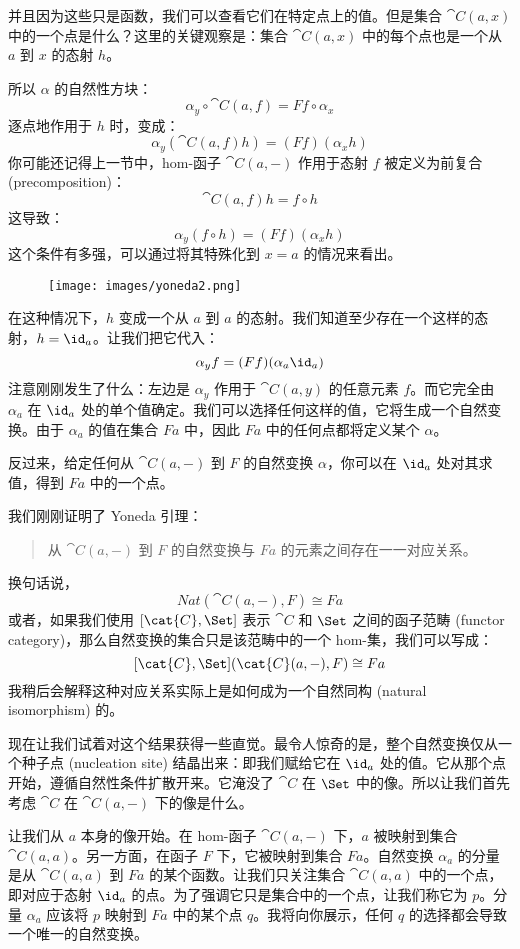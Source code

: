 \noindent
并且因为这些只是函数，我们可以查看它们在特定点上的值。但是集合 $\cat{C}(a, x)$ 中的一个点是什么？这里的关键观察是：集合 $\cat{C}(a, x)$ 中的每个点也是一个从 $a$ 到 $x$ 的态射 $h$。

所以 $\alpha$ 的自然性方块：
\[\alpha_y \circ \cat{C}(a, f) = F f \circ \alpha_x\]
逐点地作用于 $h$ 时，变成：
\[\alpha_y (\cat{C}(a, f) h) = (F f) (\alpha_x h)\]
你可能还记得上一节中，hom-函子 $\cat{C}(a,-)$ 作用于态射 $f$ 被定义为前复合 (precomposition)：
\[\cat{C}(a, f) h = f \circ h\]
这导致：
\[\alpha_y (f \circ h) = (F f) (\alpha_x h)\]
这个条件有多强，可以通过将其特殊化到 $x = a$ 的情况来看出。

\begin{figure}[H]
  \centering
  \texttt{[image: images/yoneda2.png]}
\end{figure}

\noindent
在这种情况下，$h$ 变成一个从 $a$ 到 $a$ 的态射。我们知道至少存在一个这样的态射，$h = \id_a$。让我们把它代入：
\[\alpha_y f = (F f) (\alpha_a \id_a)\]
注意刚刚发生了什么：左边是 $\alpha_y$ 作用于 $\cat{C}(a, y)$ 的任意元素 $f$。而它完全由 $\alpha_a$ 在 $\id_a$ 处的单个值确定。我们可以选择任何这样的值，它将生成一个自然变换。由于 $\alpha_a$ 的值在集合 $F a$ 中，因此 $F a$ 中的任何点都将定义某个 $\alpha$。

反过来，给定任何从 $\cat{C}(a, -)$ 到 $F$ 的自然变换 $\alpha$，你可以在 $\id_a$ 处对其求值，得到 $F a$ 中的一个点。

我们刚刚证明了 Yoneda 引理：

\begin{quote}
  从 $\cat{C}(a, -)$ 到 $F$ 的自然变换与 $F a$ 的元素之间存在一一对应关系。
\end{quote}
换句话说，
\[\mathit{Nat}(\cat{C}(a, -), F) \cong F a\]
或者，如果我们使用 $[\cat{C}, \Set]$ 表示 $\cat{C}$ 和 $\Set$ 之间的函子范畴 (functor category)，那么自然变换的集合只是该范畴中的一个 hom-集，我们可以写成：
\[[\cat{C}, \Set](\cat{C}(a, -), F) \cong F a\]
我稍后会解释这种对应关系实际上是如何成为一个自然同构 (natural isomorphism) 的。

现在让我们试着对这个结果获得一些直觉。最令人惊奇的是，整个自然变换仅从一个种子点 (nucleation site) 结晶出来：即我们赋给它在 $\id_a$ 处的值。它从那个点开始，遵循自然性条件扩散开来。它淹没了 $\cat{C}$ 在 $\Set$ 中的像。所以让我们首先考虑 $\cat{C}$ 在 $\cat{C}(a, -)$ 下的像是什么。

让我们从 $a$ 本身的像开始。在 hom-函子 $\cat{C}(a, -)$ 下，$a$ 被映射到集合 $\cat{C}(a, a)$。另一方面，在函子 $F$ 下，它被映射到集合 $F a$。自然变换 $\alpha_a$ 的分量是从 $\cat{C}(a, a)$ 到 $F a$ 的某个函数。让我们只关注集合 $\cat{C}(a, a)$ 中的一个点，即对应于态射 $\id_a$ 的点。为了强调它只是集合中的一个点，让我们称它为 $p$。分量 $\alpha_a$ 应该将 $p$ 映射到 $F a$ 中的某个点 $q$。我将向你展示，任何 $q$ 的选择都会导致一个唯一的自然变换。


